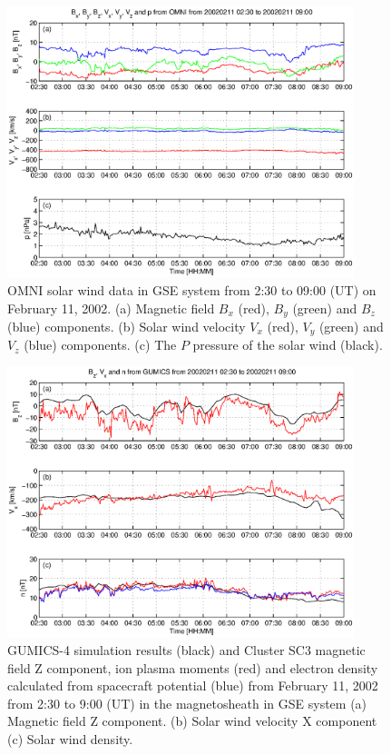 \documentclass[linenumbers,draft]{agujournal}
\begin{document}
\begin{figure}[h]
\centering
\includegraphics[width=0.9\textwidth,angle=0]{swe-2020-corr-f07.eps}  
\caption{OMNI solar wind data in GSE system from 2:30 to 09:00 (UT) on February 11, 2002. (a) Magnetic field $B_{x}$ (red), $B_{y}$ (green) and $B_{z}$ (blue) components. (b) Solar wind velocity $V_{x}$ (red), $V_{y}$ (green) and $V_{z}$ (blue) components. (c) The $P$ pressure of the solar wind (black).}
\label{fig:mshomni}
\end{figure}

\pagebreak

\begin{figure}[h]
\centering
\includegraphics[width=0.9\textwidth,angle=0]{swe-2020-corr-f08.eps}  
\caption{GUMICS-4 simulation results (black) and Cluster SC3 magnetic field Z component, ion plasma moments (red) and electron density calculated from spacecraft potential (blue) from February 11, 2002 from 2:30 to 9:00 (UT) in the magnetosheath in GSE system  (a) Magnetic field Z component. (b) Solar wind velocity X component (c) Solar wind density.}
\label{fig:mshplot}
\end{figure}
\end{document}
